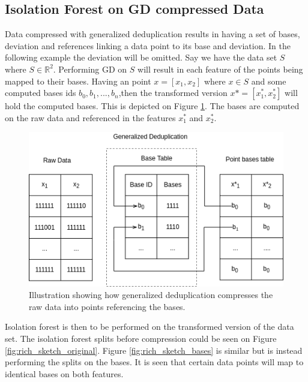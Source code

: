 \subsection{Isolation Forest on GD compressed Data}
Data compressed with generalized deduplication results in having a set of bases, deviation and references linking a data point to its base and deviation. In the following example the deviation will be omitted. Say we have the data set $S$ where $S \in \mathbb{R}^2$. Performing GD on $S$ will result in each feature of the points being mapped to their bases. Having an point $x = [x_1,x_2]$ where $x \in S$ and some computed bases ids $b_0, b_1, ..., b_n$,then the transformed version $x*=[x^*_1, x^*_2]$ will hold the computed bases. This is depicted on Figure \ref*{fig:gd_points}. The bases are computed on the raw data and referenced in the features $x^*_1$ and $x^*_2$.

\begin{figure}
  \centering
  \includegraphics[width=\linewidth]{../files/test.png}
  \caption{Illustration showing how generalized deduplication compresses the raw data into points referencing the bases.}
  \label{fig:gd_points}
\end{figure}

Isolation forest is then to be performed on the transformed version of the data set. The isolation forest splits before compression could be seen on Figure \ref{fig:rich_sketch_original}. Figure \ref{fig:rich_sketch_bases} is similar but is instead performing the splits on the bases. It is seen that certain data points will map to identical bases on both features.

